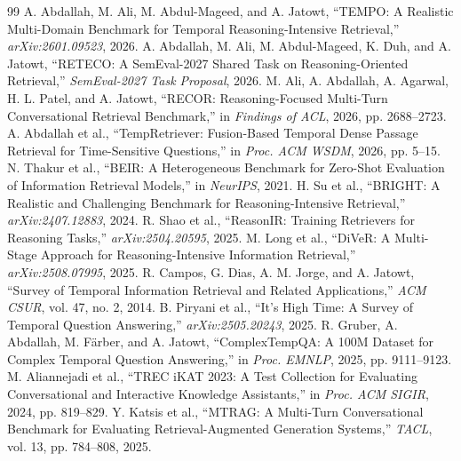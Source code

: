 \documentclass[10pt,twocolumn]{article}
\begin{document}
\begin{thebibliography}{99}
\small
{} A. Abdallah, M. Ali, M. Abdul-Mageed, and A. Jatowt, ``TEMPO: A Realistic Multi-Domain Benchmark for Temporal Reasoning-Intensive Retrieval,'' \emph{arXiv:2601.09523}, 2026.
 A. Abdallah, M. Ali, M. Abdul-Mageed, K. Duh, and A. Jatowt, ``RETECO: A SemEval-2027 Shared Task on Reasoning-Oriented Retrieval,'' \emph{SemEval-2027 Task Proposal}, 2026.
 M. Ali, A. Abdallah, A. Agarwal, H. L. Patel, and A. Jatowt, ``RECOR: Reasoning-Focused Multi-Turn Conversational Retrieval Benchmark,'' in \emph{Findings of ACL}, 2026, pp. 2688--2723.
 A. Abdallah et al., ``TempRetriever: Fusion-Based Temporal Dense Passage Retrieval for Time-Sensitive Questions,'' in \emph{Proc. ACM WSDM}, 2026, pp. 5--15.
 N. Thakur et al., ``BEIR: A Heterogeneous Benchmark for Zero-Shot Evaluation of Information Retrieval Models,'' in \emph{NeurIPS}, 2021.
 H. Su et al., ``BRIGHT: A Realistic and Challenging Benchmark for Reasoning-Intensive Retrieval,'' \emph{arXiv:2407.12883}, 2024.
 R. Shao et al., ``ReasonIR: Training Retrievers for Reasoning Tasks,'' \emph{arXiv:2504.20595}, 2025.
 M. Long et al., ``DiVeR: A Multi-Stage Approach for Reasoning-Intensive Information Retrieval,'' \emph{arXiv:2508.07995}, 2025.
 R. Campos, G. Dias, A. M. Jorge, and A. Jatowt, ``Survey of Temporal Information Retrieval and Related Applications,'' \emph{ACM CSUR}, vol. 47, no. 2, 2014.
 B. Piryani et al., ``It's High Time: A Survey of Temporal Question Answering,'' \emph{arXiv:2505.20243}, 2025.
 R. Gruber, A. Abdallah, M. F\"arber, and A. Jatowt, ``ComplexTempQA: A 100M Dataset for Complex Temporal Question Answering,'' in \emph{Proc. EMNLP}, 2025, pp. 9111--9123.
 M. Aliannejadi et al., ``TREC iKAT 2023: A Test Collection for Evaluating Conversational and Interactive Knowledge Assistants,'' in \emph{Proc. ACM SIGIR}, 2024, pp. 819--829.
 Y. Katsis et al., ``MTRAG: A Multi-Turn Conversational Benchmark for Evaluating Retrieval-Augmented Generation Systems,'' \emph{TACL}, vol. 13, pp. 784--808, 2025.
\end{thebibliography}
\end{document}
